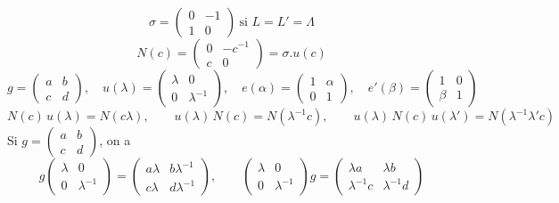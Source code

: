 \documentclass[11pt,a4paper]{article}
\begin{document}
\[
\sigma = \begin{pmatrix} 0 & -1 \\ 1 & 0 \end{pmatrix} \ \text{si } L = L' = \Lambda
\]
\[
N(c) = \begin{pmatrix} 0 & -c^{-1} \\ c & 0 \end{pmatrix} = \sigma . u(c)
\]
\[
g = \begin{pmatrix} a & b \\ c & d \end{pmatrix}, \quad
u(\lambda) = \begin{pmatrix} \lambda & 0 \\ 0 & \lambda^{-1} \end{pmatrix}, \quad
e(\alpha) = \begin{pmatrix} 1 & \alpha \\ 0 & 1 \end{pmatrix}, \quad
e'(\beta) = \begin{pmatrix} 1 & 0 \\ \beta & 1 \end{pmatrix}
\]
\[
N(c)\,u(\lambda) = N(c\lambda), \qquad u(\lambda)\,N(c) = N(\lambda^{-1}c), \qquad u(\lambda)\,N(c)\,u(\lambda') = N(\lambda^{-1}\lambda' c)
\]
Si $g = \begin{pmatrix} a & b \\ c & d \end{pmatrix}$, on a
\[
g \begin{pmatrix} \lambda & 0 \\ 0 & \lambda^{-1} \end{pmatrix} = \begin{pmatrix} a\lambda & b\lambda^{-1} \\ c\lambda & d\lambda^{-1} \end{pmatrix}, \qquad
\begin{pmatrix} \lambda & 0 \\ 0 & \lambda^{-1} \end{pmatrix} g = \begin{pmatrix} \lambda a & \lambda b \\ \lambda^{-1}c & \lambda^{-1}d \end{pmatrix}
\]
\end{document}
